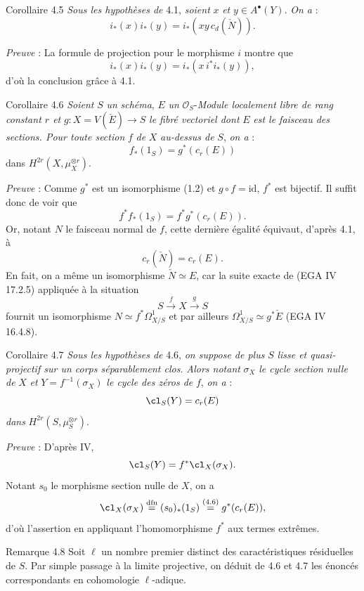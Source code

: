 \begin{statement}{Corollaire 4.5}
\emph{Sous les hypothèses de} 4.1, \emph{soient} $x$ \emph{et} $y\in A^\bullet(Y)$. \emph{On a} :
\[
i_*(x)i_*(y)=i_*(xy\,c_d(\check N)).
\]
\end{statement}

\emph{Preuve} : La formule de projection pour le morphisme $i$ montre que
\[
i_*(x)i_*(y)=i_*(x\,i^*i_*(y)),
\]
d'où la conclusion grâce à 4.1.

\begin{statement}{Corollaire 4.6}
\emph{Soient} $S$ \emph{un} \emph{schéma}, $E$ \emph{un} $\mathcal{O}_S$-\emph{Module localement libre de rang constant $r$ et} $g:X=V(\check E)\to S$ \emph{le fibré vectoriel dont} $E$ \emph{est le faisceau des sections. Pour toute section} $f$ \emph{de} $X$ \emph{au-dessus de} $S$, \emph{on a} :
\[
f_*(1_S)=g^*(c_r(E))
\]
dans $H^{2r}(X,\mu_X^{\otimes r})$.
\end{statement}

\emph{Preuve} : Comme $g^*$ est un isomorphisme (1.2) et $g\circ f=\mathrm{id}$, $f^*$ est bijectif. Il suffit donc de voir que
\[
f^*f_*(1_S)=f^*g^*(c_r(E)).
\]
Or, notant $N$ le faisceau normal de $f$, cette dernière égalité équivaut, d'après 4.1, à
\[
c_r(\check N)=c_r(E).
\]
En fait, on a même un isomorphisme $\check N\simeq E$, car la suite exacte de (EGA IV 17.2.5) appliquée à la situation
\[
S\xrightarrow{f} X\xrightarrow{g} S
\]
fournit un isomorphisme $N\simeq f^*\Omega^1_{X/S}$ et par ailleurs $\Omega^1_{X/S}\simeq g^*\check E$ (EGA IV 16.4.8).

\begin{statement}{Corollaire 4.7}
\emph{Sous les hypothèses de} 4.6, \emph{on suppose de plus} $S$ \emph{lisse et quasi-projectif sur un corps séparablement clos.} \emph{Alors notant} $\sigma_X$ \emph{le cycle section nulle de} $X$ \emph{et} $Y=f^{-1}(\sigma_X)$ \emph{le cycle des zéros de} $f$, \emph{on a} :
\[
\cl_S(Y)=c_r(E)
\]
\emph{dans} $H^{2r}(S,\mu_S^{\otimes r})$.
\end{statement}

\emph{Preuve} : D'après IV,
\[
\cl_S(Y)=f^*\cl_X(\sigma_X).
\]
Notant $s_0$ le morphisme section nulle de $X$, on a
\[
\cl_X(\sigma_X)\stackrel{\mathrm{dfn}}{=}(s_0)_*(1_S)\stackrel{(4.6)}{=}g^*(c_r(E)),
\]
d'où l'assertion en appliquant l'homomorphisme $f^*$ aux termes extrêmes.

\begin{statement}{Remarque 4.8}
Soit $\ell$ un nombre premier distinct des caractéristiques résiduelles de $S$. Par simple passage à la limite projective, on déduit de 4.6 et 4.7 les énoncés correspondants en cohomologie $\ell$-adique.
\end{statement}

